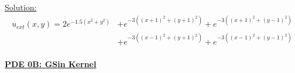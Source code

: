 \documentclass[.\jobname.tex]{subfiles}
\begin{document}
\underline{Solution: }
\begin{equation}
\label{eq:sol0A}
\begin{split}
u_{ext}(x,y) = 2e^{-1.5(x^2 + y^2)} & + e^{-3((x+1)^2 + (y+1)^2)} + e^{-3((x+1)^2 + (y-1)^2)} \\
                              & + e^{-3((x-1)^2 + (y+1)^2)} + e^{-3((x-1)^2 + (y-1)^2)} \\
\end{split}
\end{equation}


\begin{figure}[H]
	\centering
	\noindent{}
	\label{fig:sol_plot_0A}
\end{figure}





\underline{\textbf{PDE 0B: GSin Kernel}}
\end{document}
